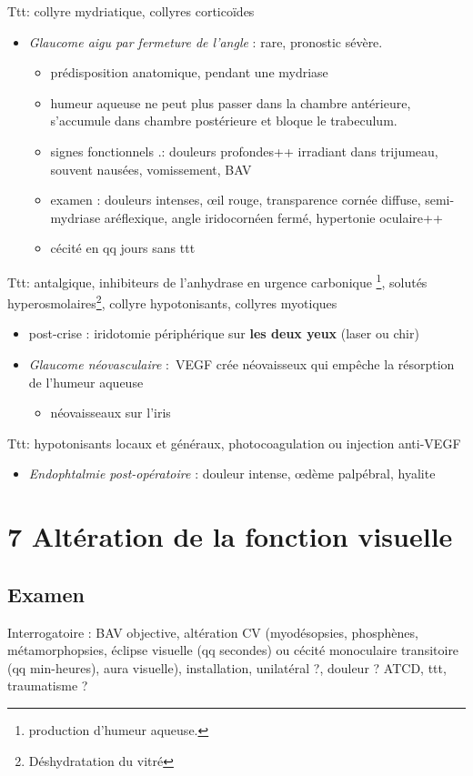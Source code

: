 \documentclass[11pt]{article}
\def\ttt{\hspace*{1cm}Ttt: }
\begin{document}
\ttt collyre mydriatique, collyres corticoïdes
\begin{itemize}
\item \emph{Glaucome aigu par fermeture de l'angle} : rare, pronostic sévère.
\begin{itemize}
\item prédisposition anatomique, pendant une mydriase
\item humeur aqueuse ne peut plus passer dans la chambre antérieure, s'accumule
dans chambre postérieure et bloque le trabeculum.
\item signes fonctionnels .: douleurs profondes++ irradiant dans trijumeau,
souvent nausées, vomissement, BAV
\item examen : douleurs intenses, \oe{}il rouge, transparence cornée \dec diffuse,
semi-mydriase aréflexique, angle iridocornéen fermé, hypertonie oculaire++
\item cécité en qq jours sans ttt \danger
\end{itemize}
\end{itemize}
\ttt antalgique, inhibiteurs de l'anhydrase en urgence \skull
    carbonique \footnote{\dec production d'humeur aqueuse.}, solutés hyperosmolaires\footnote{Déshydratation du vitré}, collyre hypotonisants,
    collyres myotiques
\begin{itemize}
\item post-crise : iridotomie périphérique sur \textbf{les deux yeux} (laser ou chir)
\end{itemize}
\begin{itemize}
\item \emph{Glaucome néovasculaire} : VEGF crée néovaisseux qui empêche la résorption de
l'humeur aqueuse
\begin{itemize}
\item néovaisseaux sur l'iris
\end{itemize}
\end{itemize}
\ttt hypotonisants locaux et généraux, photocoagulation ou injection anti-VEGF
\begin{itemize}
\item \emph{Endophtalmie post-opératoire} : douleur intense, \oe{}dème palpébral, hyalite
\end{itemize}
\section{7 Altération de la fonction visuelle}
\label{sec:org8c49ce6}
\subsection{Examen}
\label{sec:orgc5a6481}
Interrogatoire : BAV objective, altération CV  (myodésopsies, phosphènes,
métamorphopsies, éclipse visuelle (qq secondes) ou cécité monoculaire
transitoire (qq min-heures), aura visuelle), installation, unilatéral ?, douleur
? ATCD, ttt, traumatisme ?
\end{document}
